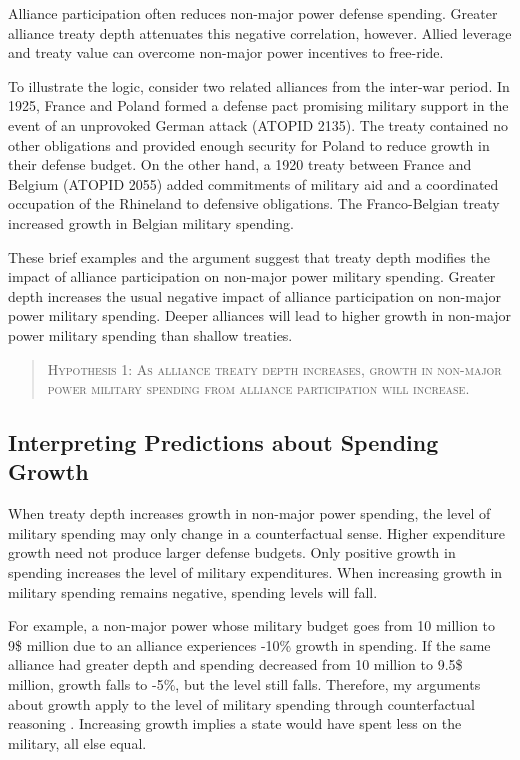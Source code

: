 \documentclass[12pt]{article}
\begin{document}
Alliance participation often reduces non-major power defense spending. 
Greater alliance treaty depth attenuates this negative correlation, however. 
Allied leverage and treaty value can overcome non-major power incentives to free-ride. 


To illustrate the logic, consider two related alliances from the inter-war period. 
In 1925, France and Poland formed a defense pact promising military support in the event of an unprovoked German attack (ATOPID 2135). 
The treaty contained no other obligations and provided enough security for Poland to reduce growth in their defense budget.
On the other hand, a 1920 treaty between France and Belgium (ATOPID 2055) added commitments of military aid and a coordinated occupation of the Rhineland to defensive obligations. 
The Franco-Belgian treaty increased growth in Belgian military spending. 
 
 
These brief examples and the argument suggest that treaty depth modifies the impact of alliance participation on non-major power military spending. 
Greater depth increases the usual negative impact of alliance participation on non-major power military spending. 
Deeper alliances will lead to higher growth in non-major power military spending than shallow treaties. 
 

\begin{quote}
\textsc{Hypothesis 1: As alliance treaty depth increases, growth in non-major power military spending from alliance participation will increase.}
\end{quote}



\subsection{Interpreting Predictions about Spending Growth}


When treaty depth increases growth in non-major power spending, the level of military spending may only change in a counterfactual sense. 
Higher expenditure growth need not produce larger defense budgets. 
Only positive growth in spending increases the level of military expenditures. 
When increasing growth in military spending remains negative, spending levels will fall. 


For example, a non-major power whose military budget goes from 10 million to 9\$ million due to an alliance experiences -10\% growth in spending. 
If the same alliance had greater depth and spending decreased from 10 million to 9.5\$ million, growth falls to -5\%, but the level still falls. 
Therefore, my arguments about growth apply to the level of military spending through counterfactual reasoning \cite{Fearon1991}. 
Increasing growth implies a state would have spent less on the military, all else equal.
\end{document}

